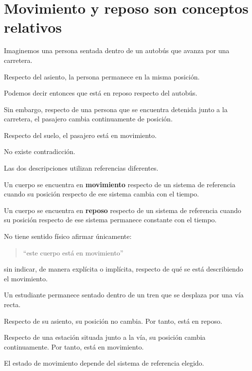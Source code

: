 \section{Movimiento y reposo son conceptos relativos}

Imaginemos una persona sentada dentro de un autobús que avanza por una
carretera.

Respecto del asiento, la persona permanece en la misma posición.

Podemos decir entonces que está en reposo respecto del autobús.

Sin embargo, respecto de una persona que se encuentra detenida junto a la
carretera, el pasajero cambia continuamente de posición.

Respecto del suelo, el pasajero está en movimiento.

No existe contradicción.

Las dos descripciones utilizan referencias diferentes.

\begin{definicion}[Movimiento]
Un cuerpo se encuentra en \textbf{movimiento} respecto de un sistema de
referencia cuando su posición respecto de ese sistema cambia con el tiempo.
\end{definicion}

\begin{definicion}[Reposo]
Un cuerpo se encuentra en \textbf{reposo} respecto de un sistema de
referencia cuando su posición respecto de ese sistema permanece constante
con el tiempo.
\end{definicion}

\begin{idea}
No tiene sentido físico afirmar únicamente:

\begin{quote}
``este cuerpo está en movimiento''
\end{quote}

sin indicar, de manera explícita o implícita, respecto de qué se está
describiendo el movimiento.
\end{idea}

\begin{ejemplo}
Un estudiante permanece sentado dentro de un tren que se desplaza por una
vía recta.

Respecto de su asiento, su posición no cambia. Por tanto, está en reposo.

Respecto de una estación situada junto a la vía, su posición cambia
continuamente. Por tanto, está en movimiento.

El estado de movimiento depende del sistema de referencia elegido.
\end{ejemplo}


